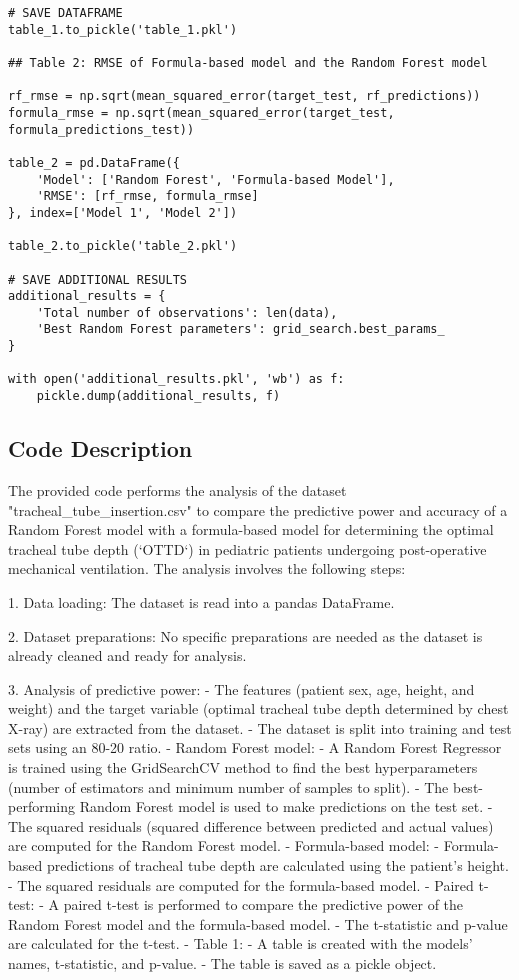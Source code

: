 \documentclass[11pt]{article}
\begin{document}
\begin{verbatim}
# SAVE DATAFRAME
table_1.to_pickle('table_1.pkl')

## Table 2: RMSE of Formula-based model and the Random Forest model

rf_rmse = np.sqrt(mean_squared_error(target_test, rf_predictions))
formula_rmse = np.sqrt(mean_squared_error(target_test, formula_predictions_test))

table_2 = pd.DataFrame({
    'Model': ['Random Forest', 'Formula-based Model'],
    'RMSE': [rf_rmse, formula_rmse]
}, index=['Model 1', 'Model 2'])

table_2.to_pickle('table_2.pkl')

# SAVE ADDITIONAL RESULTS
additional_results = {
    'Total number of observations': len(data),
    'Best Random Forest parameters': grid_search.best_params_
}

with open('additional_results.pkl', 'wb') as f:
    pickle.dump(additional_results, f)

\end{verbatim}

\subsection{Code Description}

The provided code performs the analysis of the dataset "tracheal\_tube\_insertion.csv" to compare the predictive power and accuracy of a Random Forest model with a formula-based model for determining the optimal tracheal tube depth (`OTTD`) in pediatric patients undergoing post-operative mechanical ventilation. The analysis involves the following steps:

1. Data loading: The dataset is read into a pandas DataFrame.

2. Dataset preparations: No specific preparations are needed as the dataset is already cleaned and ready for analysis.

3. Analysis of predictive power:
   - The features (patient sex, age, height, and weight) and the target variable (optimal tracheal tube depth determined by chest X-ray) are extracted from the dataset.
   - The dataset is split into training and test sets using an 80-20 ratio.
   - Random Forest model:
     - A Random Forest Regressor is trained using the GridSearchCV method to find the best hyperparameters (number of estimators and minimum number of samples to split).
     - The best-performing Random Forest model is used to make predictions on the test set.
     - The squared residuals (squared difference between predicted and actual values) are computed for the Random Forest model.
   - Formula-based model:
     - Formula-based predictions of tracheal tube depth are calculated using the patient's height.
     - The squared residuals are computed for the formula-based model.
   - Paired t-test:
     - A paired t-test is performed to compare the predictive power of the Random Forest model and the formula-based model.
     - The t-statistic and p-value are calculated for the t-test.
   - Table 1:
     - A table is created with the models' names, t-statistic, and p-value.
     - The table is saved as a pickle object.
\end{document}
